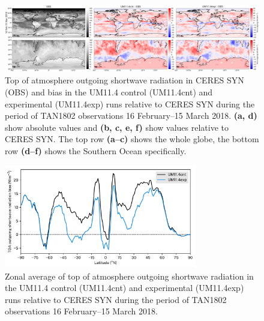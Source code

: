 \clearpage

\begin{figure}[t]
\centering
\includegraphics[width=\textwidth]{chapter4/fig/sw.png}
\caption{Top of atmosphere outgoing shortwave radiation in CERES SYN (OBS) and
bias in the UM11.4 control (UM11.4cnt) and experimental (UM11.4exp) runs relative
to CERES SYN during the period of TAN1802 observations 16 February--15 March 2018.
\textbf{(a, d)} show absolute values and \textbf{(b, c, e, f)} show values relative
to CERES SYN. The top row \textbf{(a--c)} shows the whole globe, the bottom
row \textbf{(d--f)} shows the Southern Ocean specifically.
}
\label{fig:sw}
\end{figure}

\clearpage

\begin{figure}[t]
\centering
\includegraphics[width=0.75\textwidth]{chapter4/fig/sw_zonal.pdf}
\caption{
Zonal average of top of atmosphere outgoing shortwave radiation in
the UM11.4 control (UM11.4cnt) and experimental (UM11.4exp) runs relative
to CERES SYN during the period of TAN1802 observations 16 February--15 March 2018. 
}
\label{fig:sw-zonal}
\end{figure}

\clearpage


